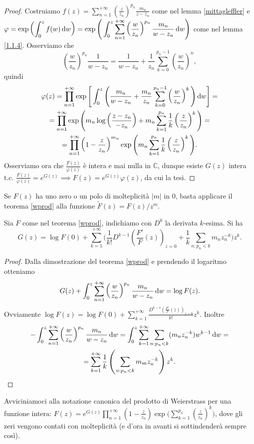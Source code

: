 \begin{proof}
  Costruiamo $\displaystyle f(z)=\sum_{n=1}^{+\infty} \left(\frac{z}{z_n}\right)^{p_n}\frac{m_n}{z-z_n}$ come nel lemma \ref{mittagleffler} e $\displaystyle \varphi=\exp\left(\int_0^z f(w)\mathop{}\!\mathrm{d} w\right)=\exp\Bigg(\int_0^z \sum_{n=1}^{+\infty}\left(\frac{w}{z_n}\right)^{p_n}\frac{m_n}{w-z_n}\mathop{}\!\mathrm{d} w\Bigg)$ come nel lemma \ref{1.1.4}.
  Osserviamo che
  $$\left(\frac{w}{z_n}\right)^{p_n}\frac{1}{w-z_n}=\frac{1}{w-z_n}+\frac{1}{z_n}\sum_{k=0}^{p_n-1}\left(\frac{w}{z_n}\right)^n,$$
  quindi
  \begin{gather*}
    \varphi(z)=\prod_{n=1}^{+\infty} \exp\Bigg[\int_0^z\Bigg(\frac{m_n}{w-z_n}+\frac{m_n}{z_n}\sum_{k=0}^{p_n-1}\left(\frac{w}{z_n}\right)^k\Bigg)\mathop{}\!\mathrm{d} w\Bigg]= \\
    =\prod_{n=1}^{+\infty}\exp\Bigg(m_n\log\left(\frac{z-z_n}{-z_n}\right)+m_n\sum_{k=1}^{p_n}\frac{1}{k}\left(\frac{z}{z_n}\right)^k\Bigg)= \\
    =\prod_{n=1}^{+\infty} \left(1-\frac{z}{z_n}\right)^{m_n}\exp\Bigg(m_n\sum_{k=1}^{p_n}\frac{1}{k}\left(\frac{z}{z_n}\right)^k\Bigg).
  \end{gather*}
  Osserviamo ora che $\frac{F(z)}{\varphi(z)}$ è intera e mai nulla in $\mathbb{C}$, dunque esiste $G(z)$ intera t.c. $\frac{F(z)}{\varphi(z)}=e^{G(z)} \implies F(z)=e^{G(z)}\varphi(z)$, da cui la tesi.
\end{proof}

\begin{oss}
  Se $F(z)$ ha uno zero o un polo di molteplicità $|m|$ in $0$, basta applicare il teorema \ref{wprod} alla funzione $\tilde{F}(z)=F(z)/z^m$.
\end{oss}

\begin{cor} \label{1.1.8}
  Sia $F$ come nel teorema \ref{wprod}, indichiamo con $D^k$ la derivata $k$-esima. Si ha
  $$G(z)=\log{F(0)}+\sum_{k=1}^{+\infty}\Bigg(\frac{1}{k!}D^{k-1}\left(\frac{F'}{F}(z)\right)_{z=0}+\frac{1}{k}\sum_{n:p_n<k}m_nz_n^{-k}\Bigg)z^k.$$
\end{cor}

\begin{proof}
  Dalla dimostrazione del teorema \ref{wprod} e prendendo il logaritmo otteniamo
  $$G(z)+\int_0^z\sum_{n=1}^{+\infty}\left(\frac{w}{z_n}\right)^{p_n}\frac{m_n}{w-z_n}\mathop{}\!\mathrm{d} w=\log{F(z)}.$$
  Ovviamente $\displaystyle \log{F(z)}=\log{F(0)}+\sum_{k=1}^{+\infty} \frac{D^{k-1}\left(\frac{F'}{F}(z)\right)_{z=0}}{k!}z^k$. Inoltre
  \begin{gather*}
    -\int_0^z \sum_{n=1}^{+\infty} \left(\frac{w}{z_n}\right)^{p_n}\frac{m_n}{w-z_n}\mathop{}\!\mathrm{d} w=\int_0^z \sum_{k=1}^{+\infty} \sum_{n: p_n<k} (m_nz_n^{-k})w^{k-1}\mathop{}\!\mathrm{d} w= \\
    =\sum_{k=1}^{+\infty} \frac{1}{k}\left(\sum_{n: p_n<k}m_mz_n^{-k}\right)z^k.
  \end{gather*}
\end{proof}

Avviciniamoci alla notazione canonica del prodotto di Weierstrass per una funzione intera: $\displaystyle F(z)=e^{G(z)}\prod_{n=1}^{+\infty}\left(1-\frac{z}{z_n}\right)\exp\Bigg(\sum_{k=1}^{p_n}\left(\frac{z}{z_n}\right)^k\Bigg)$, dove gli zeri vengono contati con molteplicità (e d'ora in avanti si sottindenderà sempre così).
